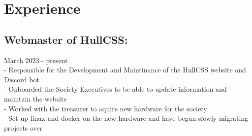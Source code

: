 \section{Experience}

\subsection{Webmaster of HullCSS:} March 2023 - present \\
\:-\: Responsible for the Development and Maintinance of the HullCSS website and Discord bot \\
\:-\: Onboarded the Society Executives to be able to update information and maintain the website \\
\:-\: Worked with the treasurer to aquire new hardware for the society \\
\:-\: Set up linux and docker on the new hardware and have begun slowly migrating projects over \\